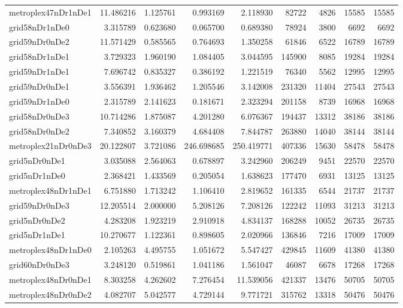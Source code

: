 \begin{longtable}{|l|r|r|r|r|r|r|r|r|}
metroplex47nDr1nDe1 & 11.486216 & 1.125761 & 0.993169 & 2.118930 & 82722 & 4826 & 15585 & 15585 \\
grid58nDr1nDe0 & 3.315789 & 0.623680 & 0.065700 & 0.689380 & 78924 & 3800 & 6692 & 6692 \\
grid59nDr0nDe2 & 11.571429 & 0.585565 & 0.764693 & 1.350258 & 61846 & 6522 & 16789 & 16789 \\
grid58nDr1nDe1 & 3.729323 & 1.960190 & 1.084405 & 3.044595 & 145900 & 8085 & 19284 & 19284 \\
grid59nDr1nDe1 & 7.696742 & 0.835327 & 0.386192 & 1.221519 & 76340 & 5562 & 12995 & 12995 \\
grid59nDr0nDe1 & 3.556391 & 1.936462 & 1.205546 & 3.142008 & 231320 & 11404 & 27543 & 27543 \\
grid59nDr1nDe0 & 2.315789 & 2.141623 & 0.181671 & 2.323294 & 201158 & 8739 & 16968 & 16968 \\
grid58nDr0nDe3 & 10.714286 & 1.875087 & 4.201280 & 6.076367 & 194437 & 13312 & 38186 & 38186 \\
grid58nDr0nDe2 & 7.340852 & 3.160379 & 4.684408 & 7.844787 & 263880 & 14040 & 38144 & 38144 \\
metroplex21nDr0nDe3 & 20.122807 & 3.721086 & 246.698685 & 250.419771 & 407336 & 15630 & 58478 & 58478 \\
grid5nDr0nDe1 & 3.035088 & 2.564063 & 0.678897 & 3.242960 & 206249 & 9451 & 22570 & 22570 \\
grid5nDr1nDe0 & 2.368421 & 1.433569 & 0.205054 & 1.638623 & 177470 & 6931 & 13125 & 13125 \\
metroplex48nDr1nDe1 & 6.751880 & 1.713242 & 1.106410 & 2.819652 & 161335 & 6544 & 21737 & 21737 \\
grid59nDr0nDe3 & 12.205514 & 2.000000 & 5.208126 & 7.208126 & 122242 & 11093 & 31213 & 31213 \\
grid5nDr0nDe2 & 4.283208 & 1.923219 & 2.910918 & 4.834137 & 168288 & 10052 & 26735 & 26735 \\
grid5nDr1nDe1 & 10.270677 & 1.122361 & 0.898605 & 2.020966 & 136846 & 7216 & 17009 & 17009 \\
metroplex48nDr1nDe0 & 2.105263 & 4.495755 & 1.051672 & 5.547427 & 429845 & 11609 & 41380 & 41380 \\
grid60nDr0nDe3 & 3.248120 & 0.519861 & 1.041186 & 1.561047 & 46087 & 6678 & 17268 & 17268 \\
metroplex48nDr0nDe1 & 8.303258 & 4.262602 & 7.276454 & 11.539056 & 421337 & 13476 & 50705 & 50705 \\
metroplex48nDr0nDe2 & 4.082707 & 5.042577 & 4.729144 & 9.771721 & 315762 & 13318 & 50476 & 50476 \\

\end{longtable}
